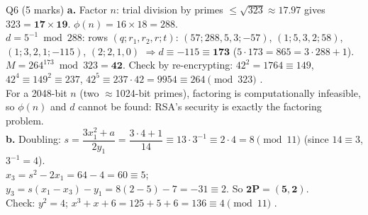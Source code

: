 \documentclass[11pt,a4paper]{article}
\begin{document}
{\begin{sol}{Q6 (5 marks)}
\textbf{a.} Factor $n$: trial division by primes $\le \sqrt{323} \approx 17.97$ gives $323 = \mathbf{17 \times 19}$. $\phi(n) = 16 \times 18 = 288$.\\
$d = 5^{-1} \bmod 288$: rows $(q; r_1, r_2, r; t)$: $(57; 288, 5, 3; -57)$, $(1; 5, 3, 2; 58)$, $(1; 3, 2, 1; -115)$, $(2; 2, 1, 0)$ $\Rightarrow d \equiv -115 \equiv \mathbf{173}$ ($5 \cdot 173 = 865 = 3 \cdot 288 + 1$).\\
$M = 264^{173} \bmod 323 = \mathbf{42}$. Check by re-encrypting: $42^2 = 1764 \equiv 149$, $42^4 \equiv 149^2 \equiv 237$, $42^5 \equiv 237 \cdot 42 = 9954 \equiv 264 \pmod{323}$ \checkmark.\\
For a 2048-bit $n$ (two $\approx$1024-bit primes), factoring is computationally infeasible, so $\phi(n)$ and $d$ cannot be found: RSA's security is exactly the factoring problem.\\[3pt]
\textbf{b.} Doubling: $s = \dfrac{3x_1^2 + a}{2y_1} = \dfrac{3 \cdot 4 + 1}{14} \equiv 13 \cdot 3^{-1} \equiv 2 \cdot 4 = 8 \pmod{11}$ (since $14 \equiv 3$, $3^{-1} = 4$).\\
$x_3 = s^2 - 2x_1 = 64 - 4 = 60 \equiv 5$; \;$y_3 = s(x_1 - x_3) - y_1 = 8(2 - 5) - 7 = -31 \equiv 2$. So $\mathbf{2P = (5, 2)}$.\\
Check: $y^2 = 4$; $x^3 + x + 6 = 125 + 5 + 6 = 136 \equiv 4 \pmod{11}$ \checkmark.
\end{sol}

}
\end{document}
